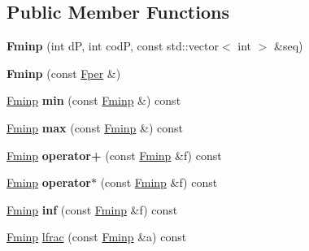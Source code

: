 \subsection*{Public Member Functions}
\begin{DoxyCompactItemize}
\item 
\mbox{\label{classetvo_i_i_1_1_fminp_a8b0bfd246c09f0c6d60a7f9227cf383d}} 
{\bfseries Fminp} (int dP, int codP, const std\+::vector$<$ int $>$ \&seq)
\item 
\mbox{\label{classetvo_i_i_1_1_fminp_af5f84089b8a99a5db203b438635c9b4f}} 
{\bfseries Fminp} (const \mbox{\hyperlink{classetvo_i_i_1_1_fper}{Fper}} \&)
\item 
\mbox{\label{classetvo_i_i_1_1_fminp_a4d4da40a93d708174e8451ed5ab964e2}} 
\mbox{\hyperlink{classetvo_i_i_1_1_fminp}{Fminp}} {\bfseries min} (const \mbox{\hyperlink{classetvo_i_i_1_1_fminp}{Fminp}} \&) const
\item 
\mbox{\label{classetvo_i_i_1_1_fminp_a899785b51920ad91e5f80a5248d1e977}} 
\mbox{\hyperlink{classetvo_i_i_1_1_fminp}{Fminp}} {\bfseries max} (const \mbox{\hyperlink{classetvo_i_i_1_1_fminp}{Fminp}} \&) const
\item 
\mbox{\label{classetvo_i_i_1_1_fminp_ad9728d86aaf4acf6eaae3c94bea866cb}} 
\mbox{\hyperlink{classetvo_i_i_1_1_fminp}{Fminp}} {\bfseries operator+} (const \mbox{\hyperlink{classetvo_i_i_1_1_fminp}{Fminp}} \&f) const
\item 
\mbox{\label{classetvo_i_i_1_1_fminp_a8722bc27d01c4605b53f97ffbbed6ef4}} 
\mbox{\hyperlink{classetvo_i_i_1_1_fminp}{Fminp}} {\bfseries operator$\ast$} (const \mbox{\hyperlink{classetvo_i_i_1_1_fminp}{Fminp}} \&f) const
\item 
\mbox{\label{classetvo_i_i_1_1_fminp_a2484d45f4427698d5d31e4fc9a3d4686}} 
\mbox{\hyperlink{classetvo_i_i_1_1_fminp}{Fminp}} {\bfseries inf} (const \mbox{\hyperlink{classetvo_i_i_1_1_fminp}{Fminp}} \&f) const
\item 
\mbox{\hyperlink{classetvo_i_i_1_1_fminp}{Fminp}} \mbox{\hyperlink{classetvo_i_i_1_1_fminp_aa86878444d1a385114f03e6afd47374e}{lfrac}} (const \mbox{\hyperlink{classetvo_i_i_1_1_fminp}{Fminp}} \&a) const

\end{DoxyCompactItemize}
